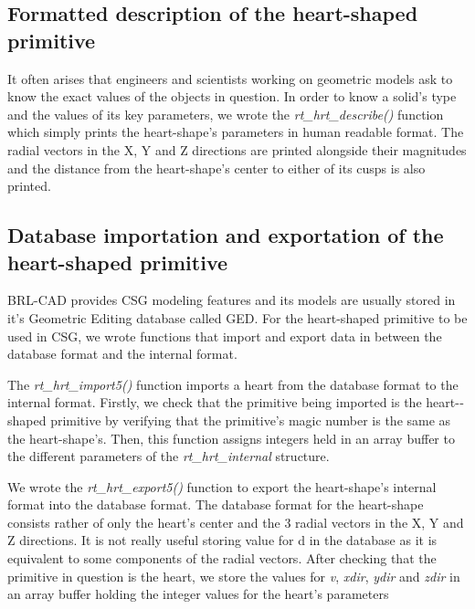 \subsection{Formatted description of the heart­-shaped primitive}

\hspace{30} It   often   arises   that   engineers   and   scientists   working   on   geometric   models  
ask   to   know   the   exact   values   of   the   objects   in   question.   In   order   to   know   a  
solid's   type   and   the   values   of   its   key   parameters,   we   wrote   the   \textit{rt\_hrt\_describe()}  
function   which   simply   prints   the   heart-shape's   parameters   in   human   readable   format.  
The   radial   vectors   in   the   X,   Y   and   Z   directions   are   printed   alongside   their  
magnitudes   and   the   distance   from   the   heart-shape's   center   to   either   of   its   cusps   is  
also printed.

\subsection{Database importation and exportation of the heart­-shaped primitive}

\hspace{30} BRL-­CAD   provides   CSG   modeling   features   and   its   models   are   usually  
stored   in   it's   Geometric   Editing   database   called   GED.   For   the   heart-­shaped  
primitive   to   be   used   in   CSG,   we   wrote   functions   that  
import and export data in between the database format and the internal format. 
  
The   \textit{rt\_hrt\_import5()}   function   imports   a   heart   from   the   database   format   to   the  
internal   format.   Firstly,   we   check   that   the   primitive   being   imported   is   the  
heart-­shaped   primitive   by   verifying   that   the   primitive's   magic   number   is   the  
same   as   the   heart­-shape's.   Then,   this   function   assigns   integers   held   in   an   array  
buffer to the different parameters of the \textit{rt\_hrt\_internal} structure.
   
We   wrote   the   \textit{rt\_hrt\_export5()}   function   to   export   the   heart-­shape's   internal  
format   into   the   database   format.   The   database   format   for   the   heart­-shape  
consists   rather   of   only   the   heart's   center   and   the   3   radial   vectors   in   the   X,   Y   and  
Z   directions.   It   is   not   really   useful   storing   value   for   d   in   the   database   as   it   is  
equivalent   to   some   components   of   the   radial   vectors.   After   checking   that   the  
primitive   in   question   is   the   heart,   we   store   the   values   for   \textit{v},   \textit{xdir},   \textit{ydir}   and   \textit{zdir} in an array buffer holding the integer values for the heart's parameters

